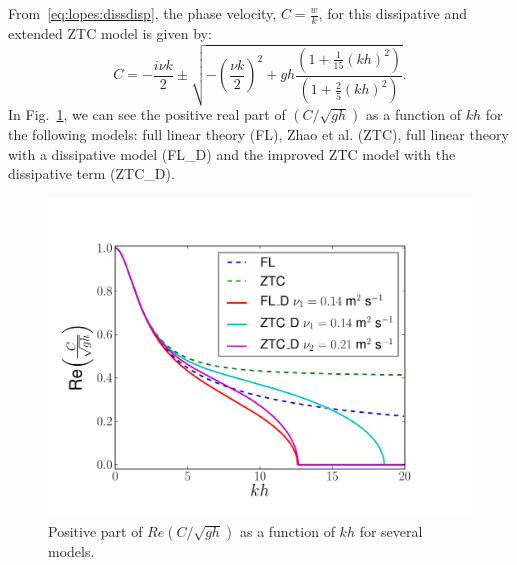From~\eqref{eq:lopes:dissdisp}, the phase velocity,
$\displaystyle C=\frac{w}{k}$, for this dissipative and extended
ZTC model is given by:
\begin{equation}\label{eq:lopes:phasevel}
C=-\frac{i\nu k}{2}\pm\sqrt{-\left(\frac{\nu
    k}{2}\right)^2+gh\frac{(1+\frac{1}{15}(kh)^2)}{(1+\frac{2}{5}(kh)^2)}}.
\end{equation}
In Fig.~\ref{fig:lopes:dispersion}, we can see the positive
real part of $\displaystyle\left(C/\sqrt{gh}\right)$ as a
function of $kh$ for the following models: full linear
theory (FL), Zhao et al. (ZTC), full linear theory with a
dissipative model (FL\_D) and the improved ZTC model with
the dissipative term (ZTC\_D).
\begin{figure}
\begin{center}
\includegraphics[width=\largefig]{chapters/lopes/pdf/phase_velocity_simple.pdf}
\end{center}
\caption{Positive part of $\displaystyle
  Re\left(C/\sqrt{gh}\right)$ as a function of $kh$ for
  several models.}
\label{fig:lopes:dispersion}
\end{figure}

